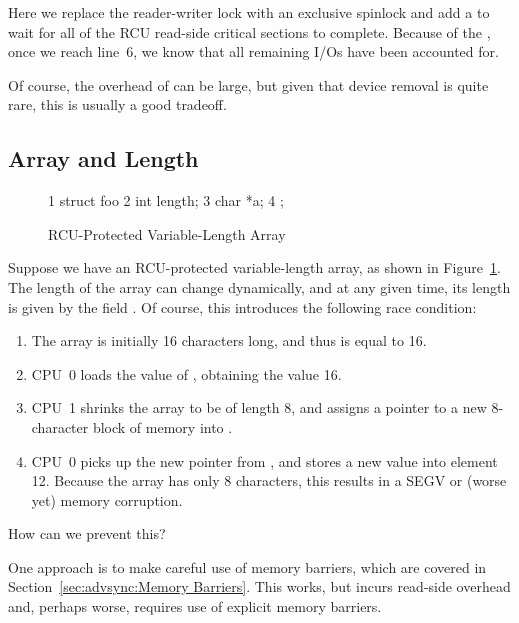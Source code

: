 Here we replace the reader-writer lock with an exclusive spinlock and
add a  to wait for all of the RCU read-side
critical sections to complete.
Because of the ,
once we reach line~6, we know that all remaining I/Os have been accounted
for.

Of course, the overhead of  can be large,
but given that device removal is quite rare, this is usually a good
tradeoff.

\subsection{Array and Length}
\label{sec:together:Array and Length}

\begin{figure}[tbp]
{ \scriptsize
\begin{verbbox}
 1 struct foo {
 2   int length;
 3   char *a;
 4 };
\end{verbbox}
}
\centering
\theverbbox
\caption{RCU-Protected Variable-Length Array}
\label{fig:together:RCU-Protected Variable-Length Array}
\end{figure}

Suppose we have an RCU-protected variable-length array, as shown in
Figure~\ref{fig:together:RCU-Protected Variable-Length Array}.
The length of the array  can change dynamically, and at any
given time, its length is given by the field .
Of course, this introduces the following race condition:

\begin{enumerate}
\item	The array is initially 16 characters long, and thus 
	is equal to 16.
\item	CPU~0 loads the value of , obtaining the value 16.
\item	CPU~1 shrinks the array to be of length 8, and assigns a pointer
	to a new 8-character block of memory into .
\item	CPU~0 picks up the new pointer from , and stores a
	new value into element 12.
	Because the array has only 8 characters, this results in
	a SEGV or (worse yet) memory corruption.
\end{enumerate}

How can we prevent this?

One approach is to make careful use of memory barriers, which are
covered in Section~\ref{sec:advsync:Memory Barriers}.
This works, but incurs read-side overhead and, perhaps worse, requires
use of explicit memory barriers.


